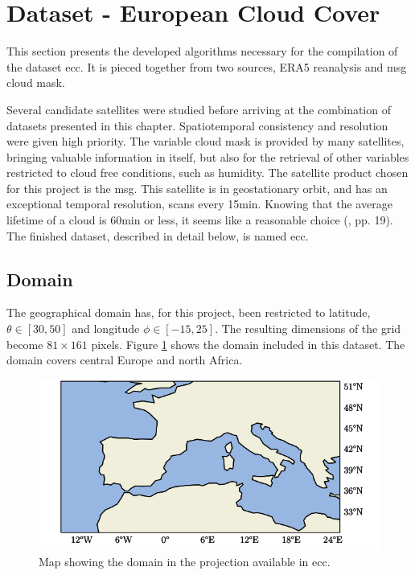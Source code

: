 \section{Dataset - European Cloud Cover }
This section presents the developed algorithms necessary for the compilation of the dataset \acrfull{ecc}. It is pieced together from two sources, ERA5 reanalysis and \acrlong{msg} cloud mask.

Several candidate satellites were studied before arriving at the combination of datasets presented in this chapter. Spatiotemporal consistency and resolution were given high priority. The variable cloud mask is provided by many satellites, bringing valuable information in itself, but also for the retrieval of other variables restricted to cloud free conditions, such as humidity. The satellite product chosen for this project is the \acrfull{msg}. This satellite is in geostationary orbit, and has an exceptional temporal resolution, scans every 15min. Knowing that the average lifetime of a cloud is 60min or less, it seems like a reasonable choice (\cite{lohmann2016}, pp. 19). The finished dataset, described in detail below, is named \acrfull{ecc}.

\subsection{Domain}
The geographical domain has, for this project, been restricted to latitude, $\theta \in[30,50]$ and longitude $\phi \in [-15, 25]$. The resulting dimensions of the grid become $81\times161$ pixels. Figure \ref{fig:map} shows the domain included in this dataset. The domain covers central Europe and north Africa.
\begin{figure}[h]
    \centering
    \includegraphics[scale = 1.0]{python_figs/Domain.png}
    \caption[Map over domain.]{Map showing the domain in the projection available in \acrshort{ecc}.}
    \label{fig:map}
\end{figure}

